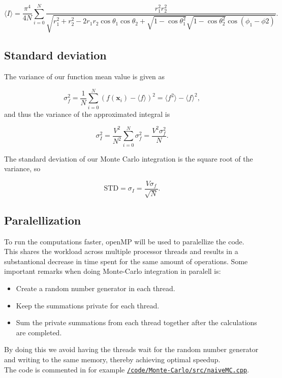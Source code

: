 \documentclass[../main.tex]{subfiles}
\begin{document}
\begin{equation}
  \langle I \rangle =\frac{\pi^4}{4N}\sum_{i=0}^N\frac{r_1^2 r_2^2}{\sqrt{r_1^2+r_2^2-2r_1r_2\cos \theta_1 \cos \theta_2 +\sqrt{1-\cos \theta_1^2}\sqrt{1-\cos \theta_2^2}\cos (\phi_1-\phi2)}}.
  \label{eq:improved-approx}
\end{equation}

\subsection{Standard deviation}\label{sec:std}
The variance of our function mean value is given as

\begin{equation*}
  \sigma_f^2=\frac{1}{N}\sum_{i=0}^N(f(\mathbf x_i)-\langle f\rangle)^2=\langle f^2\rangle-\langle f\rangle^2,
\end{equation*}
and thus the variance of the approximated integral is

\begin{equation*}
  \sigma_I^2=\frac{V^2}{N^2}\sum_{i=0}^N\sigma_f^2 = \frac{V^2\sigma_f^2}{N}.
\end{equation*}

The standard deviation of our Monte Carlo integration is the square root of the variance, so

\begin{equation}
  \text{STD}=\sigma_I = \frac{V\sigma_f}{\sqrt{N}}.
  \label{eq:std}
\end{equation}

\subsection{Paralellization} \label{sec:theory-Paralellization}

To run the computations faster, openMP will be used to paralellize the code. This shares the workload across multiple processor threads and results in a substantional decrease in time spent for the same amount of operations. Some important remarks when doing Monte-Carlo integration in paralell is:
\begin{itemize}
 \item Create a random number generator in each thread.
 \item Keep the summations private for each thread.
 \item Sum the private summations from each thread together after the calculations are completed.
\end{itemize}
By doing this we avoid having the threads wait for the random number generator and writing to the same memory, thereby achieving optimal speedup.
\\
The code is commented in for example \href{https://github.com/kmaasrud/Project-3/blob/master/code/Monte-Carlo/src/naiveMC.cpp}{\texttt{/code/Monte-Carlo/src/naiveMC.cpp}}.
\end{document}
